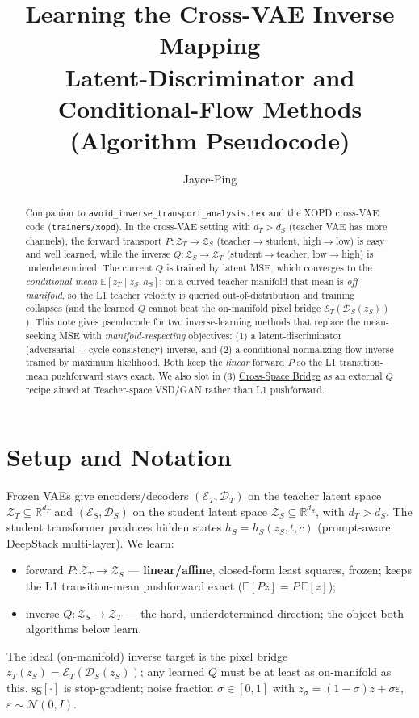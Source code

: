 \documentclass[11pt,a4paper]{article}
\title{\textbf{Learning the Cross-VAE Inverse Mapping}\\[0.3em]
\large Latent-Discriminator and Conditional-Flow Methods (Algorithm Pseudocode)}
\author{Jayce-Ping}
\date{}
\newcommand{\E}{\mathbb{E}}
\newcommand{\R}{\mathbb{R}}
\newcommand{\N}{\mathcal{N}}
\newcommand{\Za}{\mathcal{Z}_{T}}
\newcommand{\Zb}{\mathcal{Z}_{S}}
\newcommand{\Enc}{\mathcal{E}}
\newcommand{\Dec}{\mathcal{D}}
\newcommand{\sg}{\mathrm{sg}}
\newcommand{\zT}{z_{T}}
\newcommand{\zS}{z_{S}}
\newcommand{\hS}{h_{S}}
\begin{document}
\maketitle

\begin{abstract}
Companion to \texttt{avoid\_inverse\_transport\_analysis.tex} and the XOPD cross-VAE code
(\texttt{trainers/xopd}). In the cross-VAE setting with $d_T>d_S$ (teacher VAE has more
channels), the forward transport $P:\Za\!\to\!\Zb$ (teacher$\to$student, high$\to$low) is
easy and well learned, while the inverse $Q:\Zb\!\to\!\Za$ (student$\to$teacher, low$\to$high)
is underdetermined. The current $Q$ is trained by latent MSE, which converges to the
\emph{conditional mean} $\E[\zT\mid\zS,\hS]$; on a curved teacher manifold that mean is
\emph{off-manifold}, so the L1 teacher velocity is queried out-of-distribution and training
collapses (and the learned $Q$ cannot beat the on-manifold pixel bridge
$\Enc_T(\Dec_S(\zS))$). This note gives pseudocode for two inverse-learning methods that
replace the mean-seeking MSE with \emph{manifold-respecting} objectives: (1) a
latent-discriminator (adversarial + cycle-consistency) inverse, and (2) a conditional
normalizing-flow inverse trained by maximum likelihood. Both keep the \emph{linear} forward
$P$ so the L1 transition-mean pushforward stays exact. We also slot in (3)
\href{https://arxiv.org/abs/2606.32020}{Cross-Space Bridge} as an external $Q$ recipe aimed at
Teacher-space VSD/GAN rather than L1 pushforward.
\end{abstract}

\section{Setup and Notation}
\label{sec:setup}

Frozen VAEs give encoders/decoders $(\Enc_T,\Dec_T)$ on the teacher latent space
$\Za\subseteq\R^{d_T}$ and $(\Enc_S,\Dec_S)$ on the student latent space
$\Zb\subseteq\R^{d_S}$, with $d_T>d_S$. The student transformer produces hidden states
$\hS=\hS(\zS,t,c)$ (prompt-aware; DeepStack multi-layer). We learn:
\begin{itemize}[leftmargin=1.4em,itemsep=1pt]
  \item forward $P:\Za\!\to\!\Zb$ --- \textbf{linear/affine}, closed-form least squares, frozen;
        keeps the L1 transition-mean pushforward exact ($\E[Pz]=P\,\E[z]$);
  \item inverse $Q:\Zb\!\to\!\Za$ --- the hard, underdetermined direction; the object both
        algorithms below learn.
\end{itemize}
The ideal (on-manifold) inverse target is the pixel bridge
$\bar\zT(\zS)=\Enc_T(\Dec_S(\zS))$; any learned $Q$ must be at least as on-manifold as this.
$\sg[\cdot]$ is stop-gradient; noise fraction $\sigma\in[0,1]$ with
$z_\sigma=(1-\sigma)z+\sigma\varepsilon$, $\varepsilon\sim\N(0,I)$.
\end{document}
